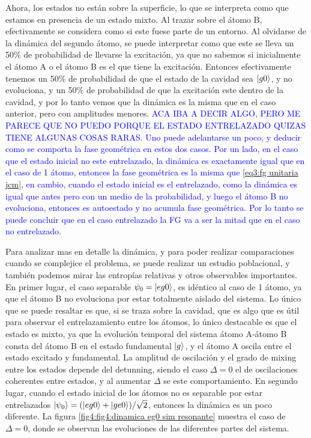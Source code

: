 Ahora, los estados no están sobre la superficie, lo que se interpreta como que estamos en presencia de un estado mixto. Al trazar sobre el átomo B, efectivamente se considera como si este fuese parte de un entorno. Al olvidarse de la dinámica del segundo átomo, se puede interpretar como que este se lleva un 50\% de probabilidad de llevarse la excitación, ya que no sabemos si inicialmente el átomo A o el átomo B es el que tiene la excitación. Entonces efectivamente tenemos un 50\% de probabilidad de que el estado de la cavidad sea $\ket{g0}$, y no evoluciona, y un 50\% de probabilidad de que la excitación este dentro de la cavidad, y por lo tanto vemos que la dinámica es la misma que en el caso anterior, pero con amplitudes menores. \textcolor{blue}{ACA IBA A DECIR ALGO, PERO ME PARECE QUE NO PUEDO PORQUE EL ESTADO ENTRELAZADO QUIZAS TIENE ALGUNAS COSAS RARAS. Uno puede adelantarse un poco, y deducir como se comporta la fase geométrica en estos dos casos. Por un lado, en el caso que el estado inicial no este entrelazado, la dinámica es exactamente igual que en el caso de 1 átomo, entonces la fase geométrica es la misma que \ref{eq3:fg unitaria jcm}, en cambio, cuando el estado inicial es el entrelazado, como la dinámica es igual que antes pero con un medio de la probabilidad, y luego el átomo B no evoluciona, entonces es autoestado y no acumula fase geométrica. Por lo tanto se puede concluir que en el caso entrelazado la FG va a ser la mitad que en el caso no entrelazado.}

Para analizar mas en detalle la dinámica, y para poder realizar comparaciones cuando se complejice el problema, se puede realizar un estudio poblacional, y también podemos mirar las entropías relativas y otros observables importantes.
En primer lugar, el caso separable $\psi_0=\ket{eg0}$, es idéntico al caso de 1 átomo, ya que el átomo B no evoluciona por estar totalmente aislado del sistema. Lo único que se puede resaltar es que, si se traza sobre la cavidad, que es algo que es útil para observar el entrelazamiento entre los átomos, lo único destacable es que el estado es mixto, ya que la evolución temporal del sistema átomo A-átomo B consta del átomo B en el estado fundamental $\ket{g}$, y el átomo A oscila entre el estado excitado y fundamental. La amplitud de oscilación y el grado de mixing entre los estados depende del detunning, siendo el caso $\Delta=0$ el de oscilaciones coherentes entre estados, y al aumentar $\Delta$ se este comportamiento.
En segundo lugar, cuando el estado inicial de los átomos no es separable por estar entrelazados $\ket{\psi_0}=(\ket{eg0} + \ket{ge0})/\sqrt{2}$, entonces la dinámica es un poco diferente. La figura \ref{fig4:fig4:dinamica eg0 sim resonante} muestra el caso de $\Delta=0$, donde se observan las evoluciones de las diferentes partes del sistema.

